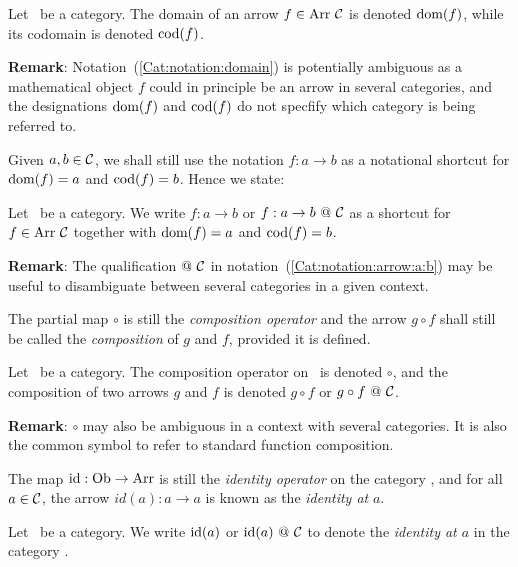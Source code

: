 \begin{notation}\label{Cat:notation:domain}
    Let \Cat\ be a category. The domain of an arrow $f\in\mbox{\rm Arr}\ \mbox{$\cal C$}$ is 
    denoted $\mbox{\rm dom}(f)$, while its codomain is denoted $\mbox{\rm cod}(f)$.
\end{notation}


\noindent
{\bf Remark}: Notation~(\ref{Cat:notation:domain}) is potentially ambiguous 
as a mathematical object $f$ could in principle be an arrow in several 
categories, and the designations $\mbox{\rm dom}(f)$ and $\mbox{\rm cod}(f)$ do not specfify 
which category is being referred to.

Given $a,b\in\mbox{$\cal C$}$, we shall still use the notation $f:a\to b$ as a
notational shortcut for $\mbox{\rm dom}(f)=a$ and $\mbox{\rm cod}(f)=b$. Hence we state:

\begin{notation}\label{Cat:notation:arrow:a:b}
    Let \Cat\ be a category. We write $f:a\to b$ or $f:a\to b\ @\ \mbox{$\cal C$}$ 
    as a shortcut for $f\in\mbox{\rm Arr}\ \mbox{$\cal C$}$ together with $\mbox{\rm dom}(f)=a$ and 
    $\mbox{\rm cod}(f)=b$.
\end{notation}
\noindent
{\bf Remark}: The qualification $@\ \mbox{$\cal C$}$ in 
notation~(\ref{Cat:notation:arrow:a:b}) may be useful to disambiguate
between several categories in a given context.

The partial map $\circ$ is still the {\em composition operator} and the 
arrow $g\circ f$ shall still be called the {\em composition} of $g$ and $f$, 
provided it is defined. 
\begin{notation}\label{Cat:notation:composition}
    Let \Cat\ be a category. The composition
    operator on \Cat\ is denoted $\circ$, and the composition of 
    two arrows $g$ and $f$ is denoted $g\circ f$ or $g\circ f\ @\ \mbox{$\cal C$}$.
\end{notation}

\noindent
{\bf Remark}: $\circ$ may also be ambiguous in a context with several 
categories. It is also the common symbol to refer to standard function
composition.

The map $\mbox{\rm id}:\mbox{\rm Ob}\to\mbox{\rm Arr}$ is still the {\em identity operator}
on the category \Cat, and for all $a\in\mbox{$\cal C$}$, the arrow $id(a):a\to a$ is 
known as the {\em identity at} $a$. 

\begin{notation}\label{Cat:notation:identity}
    Let \Cat\ be a category. We write $\mbox{\rm id}(a)$ or $\mbox{\rm id}(a)\ @\ \mbox{$\cal C$}$ 
    to denote the {\em identity at $a$} in the category \Cat.
\end{notation}

